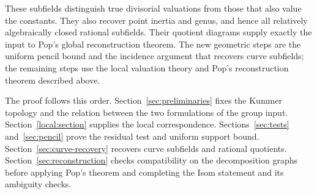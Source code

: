 These subfields distinguish true divisorial valuations from those that
also value the constants.  They also recover point inertia and genus,
and hence all relatively algebraically closed rational subfields.
Their quotient diagrams supply exactly the input to Pop's global
reconstruction theorem.  The new geometric steps are the uniform
pencil bound and the incidence argument that recovers curve subfields;
the remaining steps use the local valuation theory and Pop's
reconstruction theorem described above.

The proof follows this order.  Section~\ref{sec:preliminaries} fixes the
Kummer topology and the relation between the two formulations of the
group input.  Section~\ref{local:section} supplies the local correspondence.
Sections~\ref{sec:tests} and~\ref{sec:pencil} prove the residual test and
uniform support bound.  Section~\ref{sec:curve-recovery} recovers curve
subfields and rational quotients.  Section~\ref{sec:reconstruction}
checks compatibility on the decomposition graphs before applying Pop's
theorem and completing the Isom statement and its ambiguity checks.
